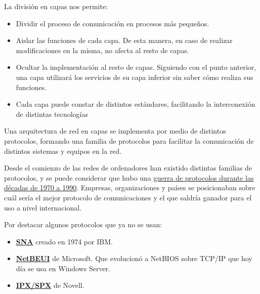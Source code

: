 La división en capas nos permite:
\begin{itemize}
    \item Dividir el proceso de comunicación en procesos más pequeños.

    \item Aislar las funciones de cada capa. De esta manera, en caso de realizar modificaciones en la misma, no afecta al resto de capas.

    \item Ocultar la implementación al resto de capas. Siguiendo con el punto anterior, una capa utilizará los servicios de su capa inferior sin saber cómo realiza sus funciones.

    \item Cada capa puede constar de distintos estándares, facilitando la interconexión de distintas tecnologías
\end{itemize}

Una arquitectura de red en capas se implementa por medio de distintos protocolos, formando una familia de protocolos para facilitar la comunicación de distintos sistemas y equipos en la red.


Desde el comienzo de las redes de ordenadores han existido distintas familias de protocolos, y se puede considerar que hubo una \href{https://en.wikipedia.org/wiki/Protocol_Wars}{guerra de protocolos durante las décadas de 1970 a 1990}. Empresas, organizaciones y países se posicionaban sobre cuál sería el mejor protocolo de comunicaciones y el que saldría ganador para el uso a nivel internacional.

Por destacar algunos protocolos que ya no se usan:

\begin{itemize}
    \item \textbf{\href{https://en.wikipedia.org/wiki/Systems_Network_Architecture}{SNA}} creado en 1974 por IBM.
    \item \textbf{\href{https://en.wikipedia.org/wiki/NetBIOS_Frames}{NetBEUI}} de Microsoft. Que evolucionó a NetBIOS sobre TCP/IP que hoy día se usa en Windows Server.
    \item \textbf{\href{https://en.wikipedia.org/wiki/IPX/SPX}{IPX/SPX}} de Novell.
\end{itemize}

